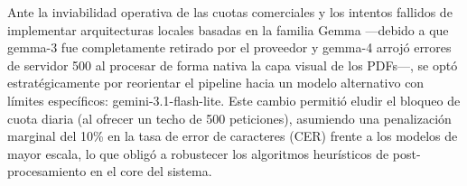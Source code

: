Ante la inviabilidad operativa de las cuotas comerciales y los intentos fallidos de implementar arquitecturas locales basadas en la familia Gemma —debido a que gemma-3 fue completamente retirado por el proveedor y gemma-4 arrojó errores de servidor 500 al procesar de forma nativa la capa visual de los PDFs—, se optó estratégicamente por reorientar el pipeline hacia un modelo alternativo con límites específicos: gemini-3.1-flash-lite. Este cambio permitió eludir el bloqueo de cuota diaria (al ofrecer un techo de 500 peticiones), asumiendo una penalización marginal del 10\% en la tasa de error de caracteres (CER) frente a los modelos de mayor escala, lo que obligó a robustecer los algoritmos heurísticos de post-procesamiento en el core del sistema.